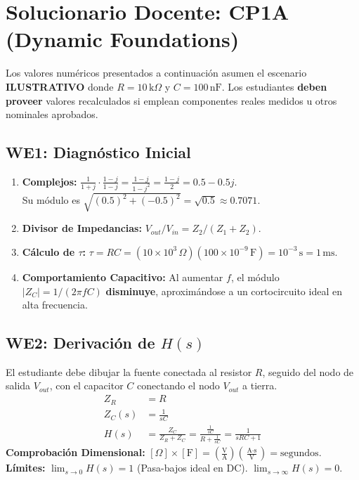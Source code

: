 \documentclass[11pt, a4paper]{article}
\begin{document}
\section*{Solucionario Docente: CP1A (Dynamic Foundations)}

\begin{tcolorbox}[colback=ucbblue!5, colframe=ucbblue, title=\textbf{Nota Crítica}]
Los valores numéricos presentados a continuación asumen el escenario \textbf{ILUSTRATIVO} donde $R = 10\,\text{k}\Omega$ y $C = 100\,\text{nF}$. Los estudiantes \textbf{deben proveer} valores recalculados si emplean componentes reales medidos u otros nominales aprobados.
\end{tcolorbox}

\subsection*{WE1: Diagnóstico Inicial}
\begin{enumerate}
    \item \textbf{Complejos:} $\frac{1}{1+j} \cdot \frac{1-j}{1-j} = \frac{1-j}{1 - j^2} = \frac{1-j}{2} = 0.5 - 0.5j$. \\ 
    Su módulo es $\sqrt{(0.5)^2 + (-0.5)^2} = \sqrt{0.5} \approx 0.7071$.
    \item \textbf{Divisor de Impedancias:} $V_{out}/V_{in} = Z_2 / (Z_1 + Z_2)$.
    \item \textbf{Cálculo de $\tau$:} $\tau = RC = (10 \times 10^3\,\Omega)(100 \times 10^{-9}\,\text{F}) = 10^{-3}\,\text{s} = 1\,\text{ms}$.
    \item \textbf{Comportamiento Capacitivo:} Al aumentar $f$, el módulo $|Z_C| = 1/(2\pi f C)$ \textbf{disminuye}, aproximándose a un cortocircuito ideal en alta frecuencia.
\end{enumerate}

\subsection*{WE2: Derivación de $H(s)$}
El estudiante debe dibujar la fuente conectada al resistor $R$, seguido del nodo de salida $V_{out}$, con el capacitor $C$ conectando el nodo $V_{out}$ a tierra.
\begin{align*}
    Z_R &= R \\
    Z_C(s) &= \frac{1}{sC} \\
    H(s) &= \frac{Z_C}{Z_R + Z_C} = \frac{\frac{1}{sC}}{R + \frac{1}{sC}} = \frac{1}{sRC + 1}
\end{align*}
\textbf{Comprobación Dimensional:} $[\Omega] \times [\text{F}] = \left(\frac{\text{V}}{\text{A}}\right) \left(\frac{\text{A}\cdot\text{s}}{\text{V}}\right) = \text{segundos}$. \\
\textbf{Límites:} $\lim_{s \to 0} H(s) = 1$ (Pasa-bajos ideal en DC). $\lim_{s \to \infty} H(s) = 0$.
\end{document}
